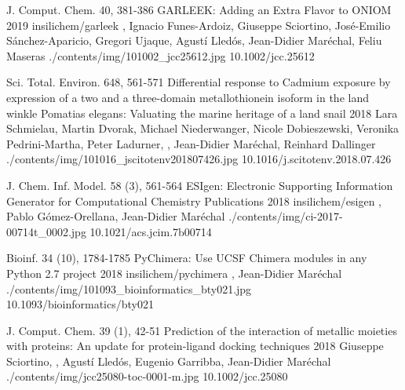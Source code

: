 \begin{cventries}

  \pubentry
    {J. Comput. Chem. 40, 381-386} %
    {GARLEEK: Adding an Extra Flavor to ONIOM} %
    {2019} %
    {insilichem/garleek} %
    {, Ignacio Funes-Ardoiz, Giuseppe Sciortino, José-Emilio Sánchez-Aparicio, Gregori Ujaque, Agustí Lledós, Jean-Didier Maréchal, Feliu Maseras} %
    {./contents/img/101002_jcc25612.jpg} %
    {10.1002/jcc.25612} %

  \pubentry
    {Sci. Total. Environ. 648, 561-571} %
    {Differential response to Cadmium exposure by expression of a two and a three-domain metallothionein isoform in the land winkle Pomatias elegans: Valuating the marine heritage of a land snail} %
    {2018} %
    {} %
    {Lara Schmielau, Martin Dvorak, Michael Niederwanger, Nicole Dobieszewski, Veronika Pedrini-Martha, Peter Ladurner, , Jean-Didier Maréchal, Reinhard Dallinger} %
    {./contents/img/101016_jscitotenv201807426.jpg} %
    {10.1016/j.scitotenv.2018.07.426} %

  \pubentry
    {J. Chem. Inf. Model. 58 (3), 561-564} %
    {ESIgen: Electronic Supporting Information Generator for Computational Chemistry Publications} %
    {2018} %
    {insilichem/esigen} %
    {,\textsuperscript{\dagger} Pablo Gómez-Orellana, Jean-Didier Maréchal\textsuperscript{\dagger}} %
    {./contents/img/ci-2017-00714t_0002.jpg} %
    {10.1021/acs.jcim.7b00714} %

  \pubentry
    {Bioinf. 34 (10), 1784-1785} %
    {PyChimera: Use UCSF Chimera modules in any Python 2.7 project} %
    {2018} %
    {insilichem/pychimera} %
    {,\textsuperscript{\dagger} Jean-Didier Maréchal\textsuperscript{\dagger}} %
    {./contents/img/101093_bioinformatics_bty021.jpg} %
    {10.1093/bioinformatics/bty021} %

  \pubentry
    {J. Comput. Chem. 39 (1), 42-51} %
    {Prediction of the interaction of metallic moieties with proteins: An update for protein-ligand docking techniques} %
    {2018} %
    {} %
    {Giuseppe Sciortino, , Agustí Lledós, Eugenio Garribba, Jean-Didier Maréchal} %
    {./contents/img/jcc25080-toc-0001-m.jpg} %
    {10.1002/jcc.25080} %


\end{cventries}
